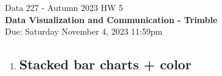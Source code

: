 \documentclass[]{book}
\theoremstyle{definition}
\begin{document}
\begin{center}
{\Large Data 227 - Autumn 2023 \hspace{0.5cm} HW 5}\\
\textbf{Data Visualization and Communication - Trimble}\\ %
Due: Saturday November 4, 2023  11:59pm   
\end{center}

\vspace{0.2 cm}

\begin{enumerate}

\item
\subsection*{Stacked bar charts + color}


\end{enumerate}
\end{document}
